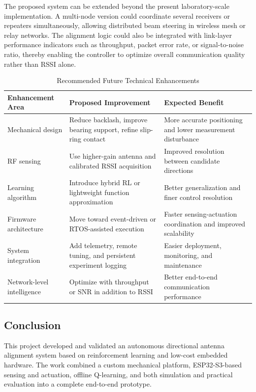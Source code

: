 The proposed system can be extended beyond the present laboratory-scale implementation.
A multi-node version could coordinate several receivers or repeaters simultaneously,
allowing distributed beam steering in wireless mesh or relay networks. The alignment logic
could also be integrated with link-layer performance indicators such as throughput, packet
error rate, or signal-to-noise ratio, thereby enabling the controller to optimize overall
communication quality rather than RSSI alone.

\begin{table}[H]
\centering
\caption{Recommended Future Technical Enhancements}
\label{tab:future_enhancements}
\renewcommand{\arraystretch}{1.4}
\begin{tabular}{|p{3.7cm}|p{4.2cm}|p{4.2cm}|}
\hline
\textbf{Enhancement Area} & \textbf{Proposed Improvement} & \textbf{Expected Benefit} \\
\hline
Mechanical design & Reduce backlash, improve bearing support, refine slip-ring contact & More accurate positioning and lower measurement disturbance \\
\hline
RF sensing & Use higher-gain antenna and calibrated RSSI acquisition & Improved resolution between candidate directions \\
\hline
Learning algorithm & Introduce hybrid RL or lightweight function approximation & Better generalization and finer control resolution \\
\hline
Firmware architecture & Move toward event-driven or RTOS-assisted execution & Faster sensing-actuation coordination and improved scalability \\
\hline
System integration & Add telemetry, remote tuning, and persistent experiment logging & Easier deployment, monitoring, and maintenance \\
\hline
Network-level intelligence & Optimize with throughput or SNR in addition to RSSI & Better end-to-end communication performance \\
\hline
\end{tabular}
\end{table}

\subsection{Conclusion}

This project developed and validated an autonomous directional antenna alignment system
based on reinforcement learning and low-cost embedded hardware. The work combined a custom
mechanical platform, ESP32-S3-based sensing and actuation, offline Q-learning, and both
simulation and practical evaluation into a complete end-to-end prototype.


